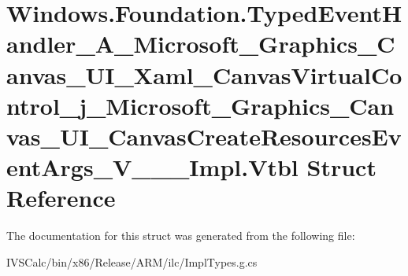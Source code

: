 \hypertarget{struct_windows_1_1_foundation_1_1_typed_event_handler___a___microsoft___graphics___canvas___u_i_bb07535079d5db8ad59aeed5d09f300a}{}\section{Windows.\+Foundation.\+Typed\+Event\+Handler\+\_\+\+A\+\_\+\+Microsoft\+\_\+\+Graphics\+\_\+\+Canvas\+\_\+\+U\+I\+\_\+\+Xaml\+\_\+\+Canvas\+Virtual\+Control\+\_\+j\+\_\+\+Microsoft\+\_\+\+Graphics\+\_\+\+Canvas\+\_\+\+U\+I\+\_\+\+Canvas\+Create\+Resources\+Event\+Args\+\_\+\+V\+\_\+\+\_\+\+\_\+\+Impl.\+Vtbl Struct Reference}
\label{struct_windows_1_1_foundation_1_1_typed_event_handler___a___microsoft___graphics___canvas___u_i_bb07535079d5db8ad59aeed5d09f300a}


The documentation for this struct was generated from the following file\+:\begin{DoxyCompactItemize}
\item 
I\+V\+S\+Calc/bin/x86/\+Release/\+A\+R\+M/ilc/Impl\+Types.\+g.\+cs\end{DoxyCompactItemize}
